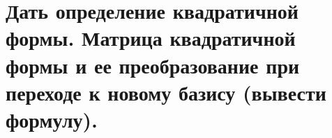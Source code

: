 \section{
    Дать определение квадратичной формы. Матрица квадратичной формы и ее преобразование при переходе к новому базису (вывести формулу).
}

